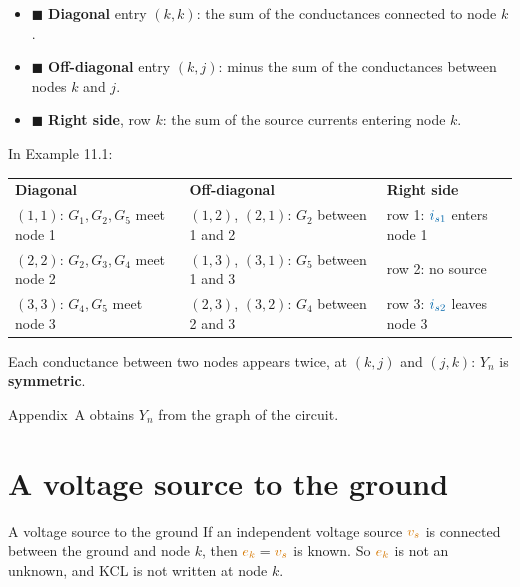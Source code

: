 \documentclass[11pt,a4paper]{article}
\newcommand{\Icol}[1]{\textcolor{ccur}{#1}}
\newcommand{\Vcol}[1]{\textcolor{cvolt}{#1}}
\newcommand{\chip}[1]{\textcolor{#1}{$\blacksquare$}}
\newcommand{\e}[1]{\textcolor{cvolt}{e_{#1}}}
\begin{document}
\begin{ideabox}
\begin{itemize}
  \item \chip{cpow!45} \textbf{Diagonal} entry $(k,k)$: the sum of the conductances connected to node $k$.
  \item \chip{metured!50} \textbf{Off-diagonal} entry $(k,j)$: minus the sum of the conductances between nodes
        $k$ and $j$.
  \item \chip{ccur!45} \textbf{Right side}, row $k$: the sum of the source currents entering node $k$.
\end{itemize}
In Example 11.1:
\par\smallskip
{\centering\small
\renewcommand{\arraystretch}{1.15}
\begin{tabular}{@{}lll@{}}
  \cellcolor{cpow!16}\textbf{Diagonal} & \cellcolor{metured!13}\textbf{Off-diagonal} & \cellcolor{ccur!14}\textbf{Right side}\\
  $(1,1)$: $G_1, G_2, G_5$ meet node 1 & $(1,2)$, $(2,1)$: $G_2$ between 1 and 2 & row 1: $\Icol{i_{s1}}$ enters node 1\\
  $(2,2)$: $G_2, G_3, G_4$ meet node 2 & $(1,3)$, $(3,1)$: $G_5$ between 1 and 3 & row 2: no source\\
  $(3,3)$: $G_4, G_5$ meet node 3 & $(2,3)$, $(3,2)$: $G_4$ between 2 and 3 & row 3: $\Icol{i_{s2}}$ leaves node 3
\end{tabular}\par}
\smallskip
Each conductance between two nodes appears twice, at $(k,j)$ and $(j,k)$: $Y_n$ is
\textbf{symmetric}.
\end{ideabox}

Appendix~A obtains $Y_n$ from the graph of the circuit.

\section{A voltage source to the ground}

\begin{definitionbox}{A voltage source to the ground}
If an independent voltage source $\Vcol{v_s}$ is connected between the ground and node $k$,
then $\e{k} = \Vcol{v_s}$ is known. So $\e{k}$ is not an unknown, and KCL is not written at
node $k$.
\end{definitionbox}
\end{document}

